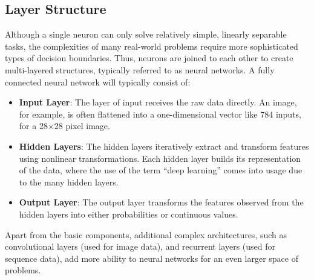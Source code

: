     \subsection{Layer Structure}
    Although a single neuron can only solve relatively simple, linearly separable tasks, the complexities of many real-world problems require more sophisticated types of decision boundaries. Thus, neurons are joined to each other to create multi-layered structures, typically referred to as neural networks. A fully connected neural network will typically consist of:
    \begin{itemize} 
        \item \textbf{Input Layer}: The layer of input receives the raw data directly. An image, for example, is often flattened into a one-dimensional vector like 784 inputs, for a 28×28 pixel image. 
        \item \textbf{Hidden Layers}: The hidden layers iteratively extract and transform features using nonlinear transformations. Each hidden layer builds its representation of the data, where the use of the term “deep learning” comes into usage due to the many hidden layers.  
        \item \textbf{Output Layer}: The output layer transforms the features observed from the hidden layers into either probabilities or continuous values. 
    \end{itemize}
   Apart from the basic components, additional complex architectures, such as convolutional layers (used for image data), and recurrent layers (used for sequence data), add more ability to neural networks for an even larger space of problems.


